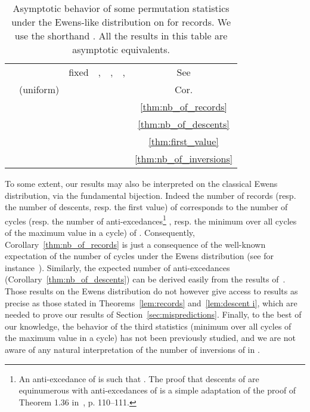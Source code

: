 \documentclass[proceedings]{aofa}
\newenvironment{remark}{\noindent{\bf Remark:} }{\hfill}
\begin{document}
\begin{table}[ht]\label{table:asymptotics}
\begin{center}
\begin{tabular}{l|l|l|l|l|l|c}
&  & fixed  & ,  & , & , &See \\
& {\small (uniform)}& & {\small  }& {\small } & {\small  }&Cor.\\
\hline 
 &  &  &  &  &  & \ref{thm:nb_of_records}\\
 &  &  &  &  &  & \ref{thm:nb_of_descents}\\
 &  &  &  &  &  & \ref{thm:first_value}\\
 &  &  &  &  &  & \ref{thm:nb_of_inversions}\\
\end{tabular}
\end{center}
\caption{Asymptotic behavior of some permutation statistics under the Ewens-like distribution on  for records.  
We use the shorthand .
All the results in this table are asymptotic equivalents.
}
\end{table}

\begin{remark}
To some extent, our results may also be interpreted on the classical Ewens distribution, via the fundamental bijection. 
Indeed the number of records (resp. the number of descents, resp. the first value) of  
corresponds to the number of cycles (resp. the number of anti-excedances\footnote{An anti-excedance of  is  such that . 
The proof that descents of  are equinumerous with anti-excedances of  is a simple adaptation of the proof of Theorem 1.36 in~\cite{Bona}, p. 110--111.}
, resp. the minimum over all cycles of the maximum value in a cycle) 
of . 
Consequently, Corollary~\ref{thm:nb_of_records} is just a consequence of the well-known expectation 
of the number of cycles under the Ewens distribution (see for instance~\cite[\S 5.2]{Arratia}).  
Similarly, the expected number of anti-excedances (Corollary~\ref{thm:nb_of_descents}) can be derived easily from the results of~\cite{Valentin}. 
Those results on the Ewens distribution do not however give access to results as precise as those stated in Theorems~\ref{lem:records} and~\ref{lem:descent i}, 
which are needed to prove our results of Section~\ref{sec:mispredictions}. 
Finally, to the best of our knowledge, the behavior of the third statistics (minimum over all cycles of the maximum value in a cycle) has not been previously studied, 
and we are not aware of any natural interpretation of the number of inversions of  in . 
\end{remark}
\end{document}
